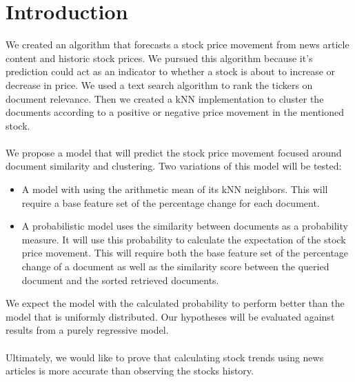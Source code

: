 \documentclass[11pt,letterpaper]{article}
\newcommand{\blue}[1]{\textcolor{RoyalBlue}{#1}}
\newcommand{\instructions}[1]{\blue{\textit{#1}}}
\begin{document}
\section{Introduction}
\label{sec:introduction}
We created an algorithm that forecasts a stock price movement from news
article content and historic stock prices.
We pursued this algorithm because it's prediction could act as an indicator to
whether a stock is about to increase or decrease in price. We used a
text search algorithm to rank the tickers on document relevance. Then we created
a kNN implementation to cluster the documents according to a positive or
negative price movement in the mentioned stock. \\  \\
We propose a model that will predict the stock price movement focused around
document similarity and clustering.
Two variations of this model will be tested:
\begin{itemize}
	\item A model with using the arithmetic mean of its kNN neighbors. This will
    require a base feature set of the percentage change for each document.
	\item A probabilistic model uses the similarity between documents as a
    probability measure. It will use this probability to calculate the expectation of
    the stock price movement. This will require both the
    base feature set of the percentage change of a document as well
    as the similarity score between the queried document and the sorted retrieved documents.
\end{itemize}
We expect the model with the calculated probability to perform better than
the model that is uniformly distributed. Our hypotheses will be evaluated
against results from a purely regressive model. ~\cite{arizona}\\ \\
Ultimately, we would like to prove that calculating stock trends using news
articles is more accurate than observing the stocks history.
\end{document}
